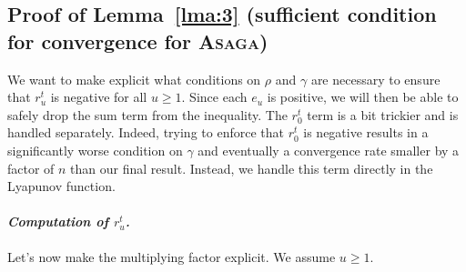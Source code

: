 \documentclass[twoside, 11pt]{article}
\newcommand{\stepsize}{\gamma}
\newcommand{\contraction}{\rho}
\newcommand{\ASAGA}{\textsc{Asaga}}
\begin{document}
\subsection{Proof of Lemma~\ref{lma:3} (sufficient condition for convergence for \ASAGA)}\label{apxB:lma3}
We want to make explicit what conditions on $\contraction$ and $\stepsize$ are necessary to ensure that $r_u^t$ is negative for all $u \geq 1$.
Since each $e_u$ is positive, we will then be able to safely drop the sum term from the inequality.
The $r_0^t$ term is a bit trickier and is handled separately.
Indeed, trying to enforce that $r_0^t$ is negative results in a significantly worse condition on $\stepsize$ and eventually a convergence rate smaller by a factor of $n$ than our final result.
Instead, we handle this term directly in the Lyapunov function.

\paragraph{\textit{Computation of $r_u^t$.}}
Let's now make the multiplying factor explicit.
We assume $u \geq 1$.
\end{document}
